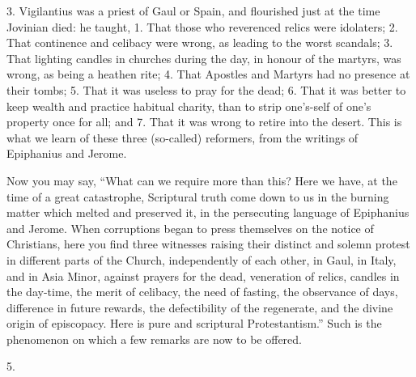 3. Vigilantius was a priest of Gaul or Spain, and flourished just
at the time Jovinian died: he taught, 1. That those who reverenced
relics were idolaters; 2. That continence and celibacy were wrong, as
leading to the worst scandals; 3. That lighting candles in churches
during the day, in honour of the martyrs, was wrong, as being a
heathen rite; 4. That Apostles and Martyrs had no presence at their
tombs; 5. That it was useless to pray for the dead; 6. That it was
better to keep wealth and practice habitual charity, than to strip one's-self
of one's property once for all; and 7. That it was wrong to retire
into the desert. This is what we learn of these three (so-called)
reformers, from the writings of Epiphanius and Jerome.

Now you may say, ``What can we require more than this? Here we
have, at the time of a great catastrophe, Scriptural truth come down
to us in the burning matter which melted and preserved it, in the
persecuting language of Epiphanius and Jerome. When corruptions
began to press themselves on the notice of Christians, here you find
three witnesses raising their distinct and solemn protest in different
parts of the Church, independently of each other, in Gaul, in Italy,
and in Asia Minor, against prayers for the dead, veneration of relics,
candles in the day-time, the merit of celibacy, the need of fasting,
the observance of days, difference in future rewards, the
defectibility of the regenerate, and the divine origin of episcopacy.
Here is pure and scriptural Protestantism.'' Such is the
phenomenon on which a few remarks are now to be offered.

5.

